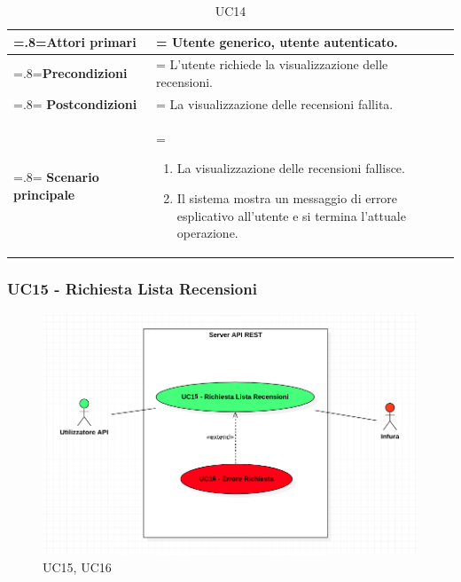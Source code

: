             \begin{table}[H]
                \centering
                \renewcommand{\arraystretch}{1.8}
                \renewcommand\tabularxcolumn[1]{m{#1}}
                \begin{tabularx}{0.9\textwidth} {
                    >{\hsize=.8\hsize\linewidth=\hsize}X
                    >{\hsize=1.2\hsize\linewidth=\hsize}X}
                    \hline
                    \textbf{Attori primari} & Utente generico, utente autenticato. \\
                    \hline
                    \textbf{Precondizioni} & L'utente richiede la visualizzazione delle recensioni. \\
                    \hline
                    \textbf{Postcondizioni} & La visualizzazione delle recensioni fallita. \\
                    \hline
                    \textbf{Scenario principale} & 
                    \begin{enumerate}
                        \item La visualizzazione delle recensioni fallisce.
                        \item Il sistema mostra un messaggio di errore esplicativo all'utente e si termina l'attuale operazione.
                    \end{enumerate} \\
                    \hline
                \end{tabularx}
                \caption{UC14}
            \end{table}

        \subsubsection{UC15 - Richiesta Lista Recensioni}
        \label{UC15}

            \begin{figure}[H]
                \centering
                \includegraphics[scale=0.5]{src/img/UC15.png}
                \caption{UC15, UC16}
            \end{figure}

